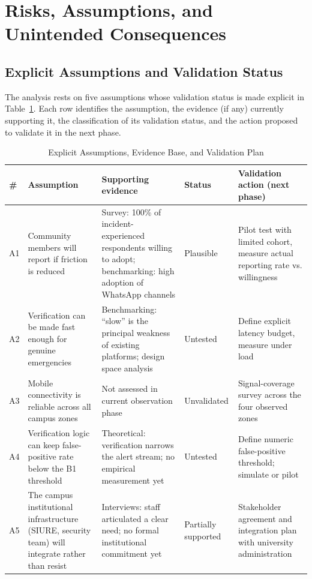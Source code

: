 \documentclass[conference]{IEEEtran}
\begin{document}
\section{Risks, Assumptions, and Unintended Consequences}
\label{sec:risks}

\subsection{Explicit Assumptions and Validation Status}
The analysis rests on five assumptions whose validation status is
made explicit in Table~\ref{tab:assumptions}. Each row identifies
the assumption, the evidence (if any) currently supporting it, the
classification of its validation status, and the action proposed
to validate it in the next phase.

\begin{table}[t]
\caption{Explicit Assumptions, Evidence Base, and Validation Plan}
\label{tab:assumptions}
\centering
\renewcommand{\arraystretch}{1.25}
\begin{tabular}{p{0.5cm}p{4.8cm}p{4.2cm}p{1.7cm}p{4.6cm}}
\toprule
\textbf{\#} & \textbf{Assumption} & \textbf{Supporting evidence} & \textbf{Status} & \textbf{Validation action (next phase)} \\
\midrule
A1 & Community members will report if friction is reduced & Survey: 100\% of incident-experienced respondents willing to adopt; benchmarking: high adoption of WhatsApp channels & Plausible & Pilot test with limited cohort, measure actual reporting rate vs. willingness \\
A2 & Verification can be made fast enough for genuine emergencies & Benchmarking: ``slow'' is the principal weakness of existing platforms; design space analysis & Untested & Define explicit latency budget, measure under load \\
A3 & Mobile connectivity is reliable across all campus zones & Not assessed in current observation phase & Unvalidated & Signal-coverage survey across the four observed zones \\
A4 & Verification logic can keep false-positive rate below the B1 threshold & Theoretical: verification narrows the alert stream; no empirical measurement yet & Untested & Define numeric false-positive threshold; simulate or pilot \\
A5 & The campus institutional infrastructure (SIURE, security team) will integrate rather than resist & Interviews: staff articulated a clear need; no formal institutional commitment yet & Partially supported & Stakeholder agreement and integration plan with university administration \\
\bottomrule
\end{tabular}
\end{table}
\end{document}
